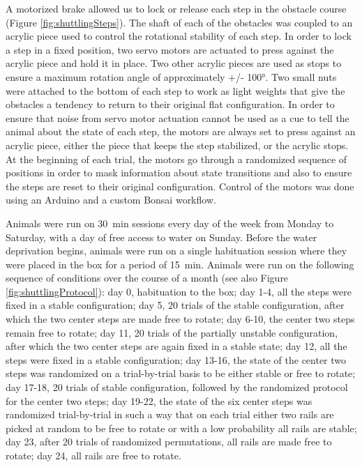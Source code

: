 A motorized brake allowed us to lock or release each step in the obstacle course (Figure \ref{fig:shuttlingSteps}). The shaft of each of the obstacles was coupled to an acrylic piece used to control the rotational stability of each step. In order to lock a step in a fixed position, two servo motors are actuated to press against the acrylic piece and hold it in place. Two other acrylic pieces are used as stops to ensure a maximum rotation angle of approximately +/- \ang{100}. Two small nuts were attached to the bottom of each step to work as light weights that give the obstacles a tendency to return to their original flat configuration. In order to ensure that noise from servo motor actuation cannot be used as a cue to tell the animal about the state of each step, the motors are always set to press against an acrylic piece, either the piece that keeps the step stabilized, or the acrylic stops. At the beginning of each trial, the motors go through a randomized sequence of positions in order to mask information about state transitions and also to ensure the steps are reset to their original configuration. Control of the motors was done using an Arduino and a custom Bonsai workflow.

Animals were run on \SI{30}{\minute} sessions every day of the week from Monday to Saturday, with a day of free access to water on Sunday. Before the water deprivation begins, animals were run on a single habituation session where they were placed in the box for a period of \SI{15}{\minute}. Animals were run on the following sequence of conditions over the course of a month (see also Figure \ref{fig:shuttlingProtocol}): day 0, habituation to the box; day 1-4, all the steps were fixed in a stable configuration; day 5, 20 trials of the stable configuration, after which the two center steps are made free to rotate; day 6-10, the center two steps remain free to rotate; day 11, 20 trials of the partially unstable configuration, after which the two center steps are again fixed in a stable state; day 12, all the steps were fixed in a stable configuration; day 13-16, the state of the center two steps was randomized on a trial-by-trial basis to be either stable or free to rotate; day 17-18, 20 trials of stable configuration, followed by the randomized protocol for the center two steps; day 19-22, the state of the six center steps was randomized trial-by-trial in such a way that on each trial either two rails are picked at random to be free to rotate or with a low probability all rails are stable; day 23, after 20 trials of randomized permutations, all rails are made free to rotate; day 24, all rails are free to rotate.

